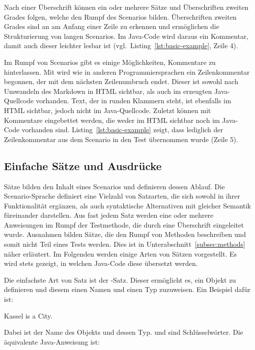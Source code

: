 Nach einer Überschrift können ein oder mehrere Sätze und Überschriften zweiten Grades folgen, welche den Rumpf des Scenarios bilden.
Überschriften zweiten Grades sind an \mdcode{##} am Anfang einer Zeile zu erkennen und ermöglichen die Strukturierung von langen Scenarios.
Im Java-Code wird daraus ein Kommentar, damit auch dieser leichter lesbar ist (vgl.\ Listing~\ref{lst:basic-example}, Zeile 4).

Im Rumpf von Scenarios gibt es einige Möglichkeiten, Kommentare zu hinterlassen.
Mit \jcode{//} wird wie in anderen Programmiersprachen ein Zeilenkommentar begonnen, der mit dem nächsten Zeilenumbruch endet.
Dieser ist sowohl nach Umwandeln des Markdown in HTML sichtbar, als auch im erzeugten Java-Quellcode vorhanden.
Text, der in runden Klammern  steht, ist ebenfalls im HTML sichtbar, jedoch nicht im Java-Quellcode.
Zuletzt können mit  Kommentare eingebettet werden, die weder im HTML sichtbar noch im Java-Code vorhanden sind.
Listing~\ref{lst:basic-example} zeigt, dass lediglich der Zeilenkommentar aus dem Scenario in den Test übernommen wurde (Zeile 5).

\subsection{Einfache Sätze und Ausdrücke}\label{subsec:simple-sentences-and-expressions}

Sätze bilden den Inhalt eines Scenarios und definieren dessen Ablauf.
Die Scenario-Sprache definiert eine Vielzahl von Satzarten, die sich sowohl in ihrer Funktionalität ergänzen, als auch syntaktische Alternativen mit gleicher Semantik füreinander darstellen.
Aus fast jedem Satz werden eine oder mehrere Anweisungen im Rumpf der Testmethode, die durch eine Überschrift eingeleitet wurde.
Ausnahmen bilden Sätze, die den Rumpf von Methoden beschreiben und somit nicht Teil eines Tests werden.
Dies ist in Unterabschnitt~\ref{subsec:methods} näher erläutert.
Im Folgenden werden einige Arten von Sätzen vorgestellt.
Es wird stets gezeigt, in welchen Java-Code diese übersetzt werden.

Die einfachste Art von Satz ist der -Satz.
Dieser ermöglicht es, ein Objekt zu definieren und diesem einen Namen und einen Typ zuzuweisen.
Ein Beispiel dafür ist:

\begin{codeblock}
    Kassel is a City.
\end{codeblock}

Dabei ist  der Name des Objekts und  dessen Typ.
 und  sind Schlüsselwörter.
Die äquivalente Java-Anweisung ist:

